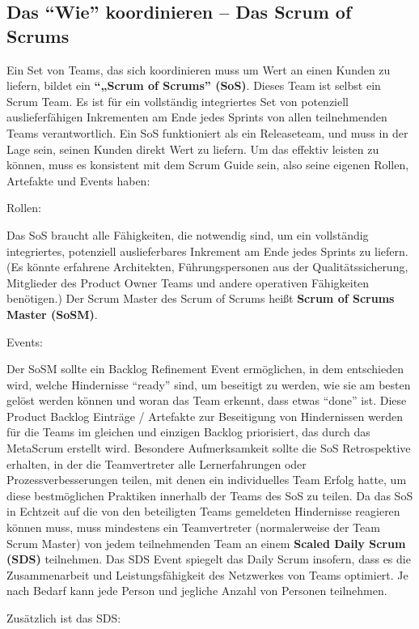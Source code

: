\documentclass[12pt,a4paper,parskip=full]{scrartcl}
\begin{document}
\subsection{Das ``Wie'' koordinieren – Das Scrum of Scrums}
Ein Set von Teams, das sich koordinieren muss um Wert an einen Kunden zu liefern, bildet ein \textbf{``„Scrum of Scrums'' (SoS)}. Dieses Team ist selbst ein Scrum Team. Es ist für ein vollständig integriertes Set von potenziell auslieferfähigen Inkrementen am Ende jedes Sprints von allen teilnehmenden Teams verantwortlich. Ein SoS funktioniert als ein Releaseteam, und muss in der Lage sein, seinen Kunden direkt Wert zu liefern. Um das effektiv leisten zu können, muss es konsistent mit dem Scrum Guide sein, also seine eigenen Rollen, Artefakte und Events haben:

Rollen:

Das SoS braucht alle Fähigkeiten, die notwendig sind, um ein vollständig integriertes, potenziell auslieferbares Inkrement am Ende jedes Sprints zu liefern. (Es könnte erfahrene Architekten, Führungspersonen aus der Qualitätssicherung, Mitglieder des Product Owner Teams und andere operativen Fähigkeiten benötigen.) Der Scrum Master des Scrum of Scrums heißt \textbf{Scrum of Scrums Master (SoSM)}.

Events:

Der SoSM sollte ein Backlog Refinement Event ermöglichen, in dem entschieden wird, welche Hindernisse ``ready'' sind, um beseitigt zu werden, wie sie am besten gelöst werden können und woran das Team erkennt, dass etwas ``done'' ist. Diese Product Backlog Einträge / Artefakte zur Beseitigung von Hindernissen werden für die Teams im gleichen und einzigen Backlog priorisiert, das durch das MetaScrum erstellt wird.
Besondere Aufmerksamkeit sollte die SoS Retrospektive erhalten, in der die Teamvertreter alle Lernerfahrungen oder Prozessverbesserungen teilen, mit denen ein individuelles Team Erfolg hatte, um diese bestmöglichen Praktiken innerhalb der Teams des SoS zu teilen.
Da das SoS in Echtzeit auf die von den beteiligten Teams gemeldeten Hindernisse reagieren können muss, muss mindestens ein Teamvertreter (normalerweise der Team Scrum Master) von jedem teilnehmenden Team an einem \textbf{Scaled Daily Scrum (SDS)} teilnehmen. Das SDS Event spiegelt das Daily Scrum insofern, dass es die Zusammenarbeit und Leistungsfähigkeit des Netzwerkes von Teams optimiert. Je nach Bedarf kann jede Person und jegliche Anzahl von Personen teilnehmen.

Zusätzlich ist das SDS:
\end{document}

